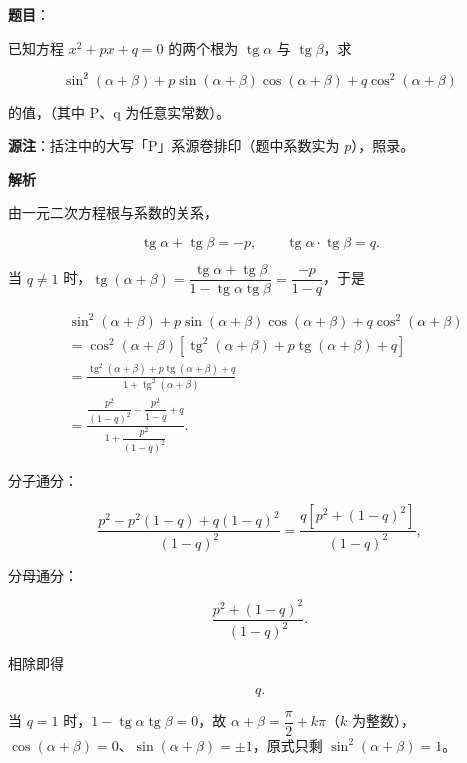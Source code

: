 \begin{answer}

\textbf{题目}：

已知方程 $x^{2}+px+q=0$ 的两个根为 $\operatorname{tg}\alpha$ 与 $\operatorname{tg}\beta$，求

\nopagebreak[4]
\[
\sin^{2}(\alpha+\beta)+p\sin(\alpha+\beta)\cos(\alpha+\beta)+q\cos^{2}(\alpha+\beta)
\]

的值，（其中 P、q 为任意实常数）。

\begin{gktip}
\textbf{源注}：括注中的大写「P」系源卷排印（题中系数实为 $p$），照录。
\end{gktip}

\textbf{解析}

由一元二次方程根与系数的关系，

\nopagebreak[4]
\[
\operatorname{tg}\alpha+\operatorname{tg}\beta=-p,
\qquad
\operatorname{tg}\alpha\cdot\operatorname{tg}\beta=q.
\]

当 $q\neq1$ 时，$\operatorname{tg}(\alpha+\beta)=\dfrac{\operatorname{tg}\alpha+\operatorname{tg}\beta}{1-\operatorname{tg}\alpha\operatorname{tg}\beta}=\dfrac{-p}{1-q}$，于是

\nopagebreak[4]
\[
\begin{aligned}
&\sin^{2}(\alpha+\beta)+p\sin(\alpha+\beta)\cos(\alpha+\beta)+q\cos^{2}(\alpha+\beta)\\
&=\cos^{2}(\alpha+\beta)\left[\operatorname{tg}^{2}(\alpha+\beta)+p\operatorname{tg}(\alpha+\beta)+q\right]\\
&=\frac{\operatorname{tg}^{2}(\alpha+\beta)+p\operatorname{tg}(\alpha+\beta)+q}{1+\operatorname{tg}^{2}(\alpha+\beta)}\\
&=\frac{\dfrac{p^{2}}{(1-q)^{2}}-\dfrac{p^{2}}{1-q}+q}{1+\dfrac{p^{2}}{(1-q)^{2}}}.
\end{aligned}
\]

分子通分：

\nopagebreak[4]
\[
\frac{p^{2}-p^{2}(1-q)+q(1-q)^{2}}{(1-q)^{2}}
=\frac{q\left[p^{2}+(1-q)^{2}\right]}{(1-q)^{2}},
\]

分母通分：

\nopagebreak[4]
\[
\frac{p^{2}+(1-q)^{2}}{(1-q)^{2}}.
\]

相除即得

\nopagebreak[4]
\[
q.
\]

当 $q=1$ 时，$1-\operatorname{tg}\alpha\operatorname{tg}\beta=0$，故 $\alpha+\beta=\dfrac{\pi}{2}+k\pi$（$k$ 为整数），$\cos(\alpha+\beta)=0$、$\sin(\alpha+\beta)=\pm1$，原式只剩 $\sin^{2}(\alpha+\beta)=1$。


\end{answer}
